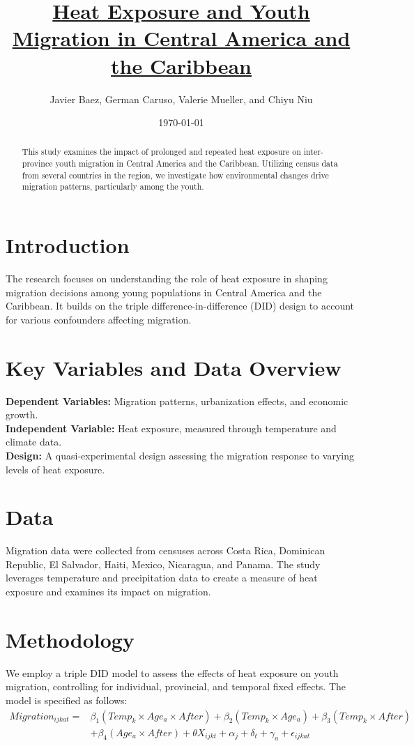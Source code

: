 \documentclass[12pt]{article}
\title{\href{https://doi.org/10.1257/aer.p20171053}{Heat Exposure and Youth Migration in Central America and the Caribbean}}
\author{Javier Baez, German Caruso, Valerie Mueller, and Chiyu Niu}
\date{\today}
\begin{document}
\maketitle

\begin{abstract}
This study examines the impact of prolonged and repeated heat exposure on inter-province youth migration in Central America and the Caribbean. Utilizing census data from several countries in the region, we investigate how environmental changes drive migration patterns, particularly among the youth.
\end{abstract}

\section{Introduction}
The research focuses on understanding the role of heat exposure in shaping migration decisions among young populations in Central America and the Caribbean. It builds on the triple difference-in-difference (DID) design to account for various confounders affecting migration.

\section{Key Variables and Data Overview}
\textbf{Dependent Variables:} Migration patterns, urbanization effects, and economic growth. \\
\textbf{Independent Variable:} Heat exposure, measured through temperature and climate data. \\
\textbf{Design:} A quasi-experimental design assessing the migration response to varying levels of heat exposure.

\section{Data}
Migration data were collected from censuses across Costa Rica, Dominican Republic, El Salvador, Haiti, Mexico, Nicaragua, and Panama. The study leverages temperature and precipitation data to create a measure of heat exposure and examines its impact on migration.

\section{Methodology}
We employ a triple DID model to assess the effects of heat exposure on youth migration, controlling for individual, provincial, and temporal fixed effects. The model is specified as follows:
\begin{align}
Migration_{ijkat} = & \beta_1 (Temp_k \times Age_a \times After) + \beta_2 (Temp_k \times Age_a) + \beta_3 (Temp_k \times After) \nonumber \\
& + \beta_4 (Age_a \times After) + \theta X_{ijkt} + \alpha_j + \delta_t + \gamma_a + \epsilon_{ijkat}
\end{align}
\end{document}
